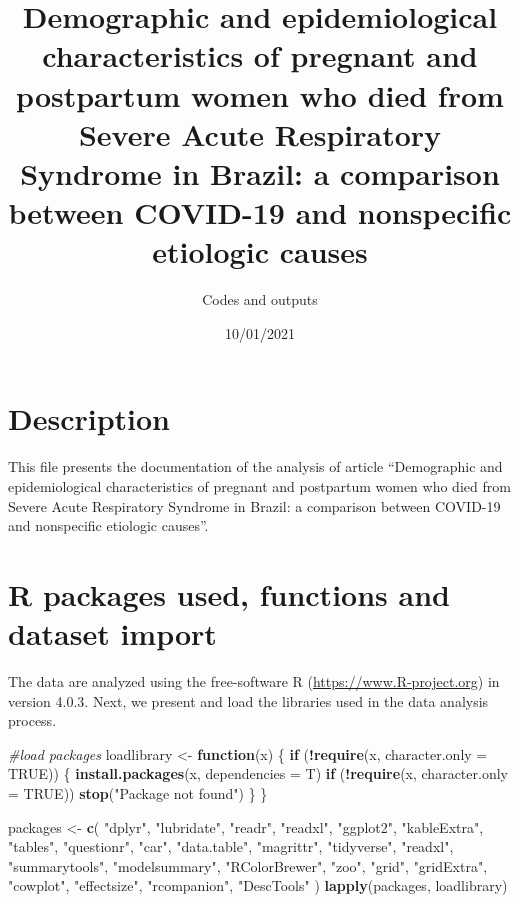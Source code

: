 \documentclass[
]{article}
\title{Demographic and epidemiological characteristics of pregnant and
postpartum women who died from Severe Acute Respiratory Syndrome in
Brazil: a comparison between COVID-19 and nonspecific etiologic causes}
\author{Codes and outputs}
\date{10/01/2021}
\newenvironment{Shaded}{\begin{snugshade}}{\end{snugshade}}
\newcommand{\CommentTok}[1]{\textcolor[rgb]{0.56,0.35,0.01}{\textit{#1}}}
\newcommand{\ControlFlowTok}[1]{\textcolor[rgb]{0.13,0.29,0.53}{\textbf{#1}}}
\newcommand{\DataTypeTok}[1]{\textcolor[rgb]{0.13,0.29,0.53}{#1}}
\newcommand{\KeywordTok}[1]{\textcolor[rgb]{0.13,0.29,0.53}{\textbf{#1}}}
\newcommand{\NormalTok}[1]{#1}
\newcommand{\OperatorTok}[1]{\textcolor[rgb]{0.81,0.36,0.00}{\textbf{#1}}}
\newcommand{\OtherTok}[1]{\textcolor[rgb]{0.56,0.35,0.01}{#1}}
\newcommand{\StringTok}[1]{\textcolor[rgb]{0.31,0.60,0.02}{#1}}
\begin{document}
\maketitle

\hypertarget{description}{%
\section{Description}\label{description}}

This file presents the documentation of the analysis of article
``Demographic and epidemiological characteristics of pregnant and
postpartum women who died from Severe Acute Respiratory Syndrome in
Brazil: a comparison between COVID-19 and nonspecific etiologic
causes''.

\hypertarget{r-packages-used-functions-and-dataset-import}{%
\section{R packages used, functions and dataset
import}\label{r-packages-used-functions-and-dataset-import}}

The data are analyzed using the free-software R
(\url{https://www.R-project.org}) in version 4.0.3. Next, we present and
load the libraries used in the data analysis process.

\begin{Shaded}
\begin{Highlighting}[]
\CommentTok{#load packages}
\NormalTok{loadlibrary <-}\StringTok{ }\ControlFlowTok{function}\NormalTok{(x) \{}
  \ControlFlowTok{if}\NormalTok{ (}\OperatorTok{!}\KeywordTok{require}\NormalTok{(x, }\DataTypeTok{character.only =} \OtherTok{TRUE}\NormalTok{)) \{}
    \KeywordTok{install.packages}\NormalTok{(x, }\DataTypeTok{dependencies =}\NormalTok{ T)}
    \ControlFlowTok{if}\NormalTok{ (}\OperatorTok{!}\KeywordTok{require}\NormalTok{(x, }\DataTypeTok{character.only =} \OtherTok{TRUE}\NormalTok{))}
      \KeywordTok{stop}\NormalTok{(}\StringTok{"Package not found"}\NormalTok{)}
\NormalTok{  \}}
\NormalTok{\}}

\NormalTok{packages <-}
\StringTok{  }\KeywordTok{c}\NormalTok{(}
    \StringTok{"dplyr"}\NormalTok{,}
    \StringTok{"lubridate"}\NormalTok{,}
    \StringTok{"readr"}\NormalTok{,}
    \StringTok{"readxl"}\NormalTok{,}
    \StringTok{"ggplot2"}\NormalTok{,}
    \StringTok{"kableExtra"}\NormalTok{,}
    \StringTok{"tables"}\NormalTok{,}
    \StringTok{"questionr"}\NormalTok{,}
    \StringTok{"car"}\NormalTok{,}
    \StringTok{"data.table"}\NormalTok{,}
    \StringTok{"magrittr"}\NormalTok{,}
    \StringTok{"tidyverse"}\NormalTok{,}
    \StringTok{"readxl"}\NormalTok{,}
    \StringTok{"summarytools"}\NormalTok{,}
    \StringTok{"modelsummary"}\NormalTok{,}
    \StringTok{"RColorBrewer"}\NormalTok{,}
    \StringTok{"zoo"}\NormalTok{,}
    \StringTok{"grid"}\NormalTok{,}
    \StringTok{"gridExtra"}\NormalTok{,}
    \StringTok{"cowplot"}\NormalTok{,}
    \StringTok{"effectsize"}\NormalTok{,}
    \StringTok{"rcompanion"}\NormalTok{,}
    \StringTok{"DescTools"}
\NormalTok{  )}
\KeywordTok{lapply}\NormalTok{(packages, loadlibrary)}
\end{Highlighting}
\end{Shaded}
\end{document}
